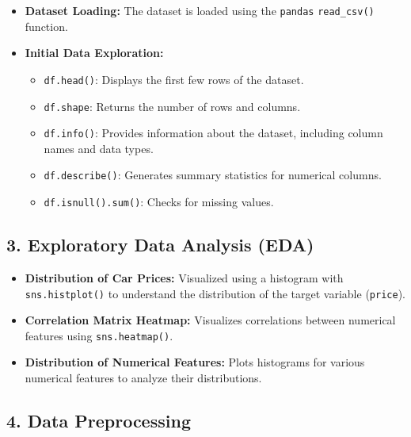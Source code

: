 \documentclass[journal]{IEEEtran}
\begin{document}
\begin{itemize}
    \item \textbf{Dataset Loading:} The dataset is loaded using the \texttt{pandas} \texttt{read\_csv()} function.
    \item \textbf{Initial Data Exploration:}
    \begin{itemize}
        \item \texttt{df.head()}: Displays the first few rows of the dataset.
        \item \texttt{df.shape}: Returns the number of rows and columns.
        \item \texttt{df.info()}: Provides information about the dataset, including column names and data types.
        \item \texttt{df.describe()}: Generates summary statistics for numerical columns.
        \item \texttt{df.isnull().sum()}: Checks for missing values.
    \end{itemize}
\end{itemize}

\subsection{3. Exploratory Data Analysis (EDA)}

\begin{itemize}
    \item \textbf{Distribution of Car Prices:} Visualized using a histogram with \texttt{sns.histplot()} to understand the distribution of the target variable (\texttt{price}).
    \item \textbf{Correlation Matrix Heatmap:} Visualizes correlations between numerical features using \texttt{sns.heatmap()}.
    \item \textbf{Distribution of Numerical Features:} Plots histograms for various numerical features to analyze their distributions.
\end{itemize}

\subsection{4. Data Preprocessing}
\end{document}

